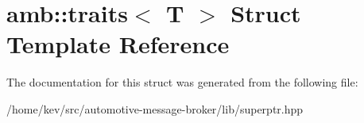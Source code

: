 \hypertarget{structamb_1_1traits}{\section{amb\+:\+:traits$<$ T $>$ Struct Template Reference}
\label{structamb_1_1traits}
}


The documentation for this struct was generated from the following file\+:\begin{DoxyCompactItemize}
\item 
/home/kev/src/automotive-\/message-\/broker/lib/superptr.\+hpp\end{DoxyCompactItemize}
